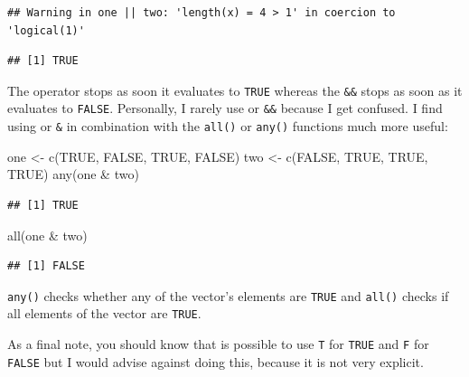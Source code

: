 \documentclass[
]{article}
\newenvironment{Shaded}{\begin{snugshade}}{\end{snugshade}}
\newcommand{\ConstantTok}[1]{\textcolor[rgb]{0.00,0.00,0.00}{#1}}
\newcommand{\FunctionTok}[1]{\textcolor[rgb]{0.00,0.00,0.00}{#1}}
\newcommand{\NormalTok}[1]{#1}
\newcommand{\OtherTok}[1]{\textcolor[rgb]{0.56,0.35,0.01}{#1}}
\newcommand{\SpecialCharTok}[1]{\textcolor[rgb]{0.00,0.00,0.00}{#1}}
\begin{document}
\begin{verbatim}
## Warning in one || two: 'length(x) = 4 > 1' in coercion to 'logical(1)'
\end{verbatim}

\begin{verbatim}
## [1] TRUE
\end{verbatim}

The \texttt{\textbar{}\textbar{}} operator stops as soon it evaluates to \texttt{TRUE} whereas the \texttt{\&\&} stops as soon as it evaluates to \texttt{FALSE}.
Personally, I rarely use \texttt{\textbar{}\textbar{}} or \texttt{\&\&} because I get confused. I find using \texttt{\textbar{}} or \texttt{\&} in combination with the
\texttt{all()} or \texttt{any()} functions much more useful:

\begin{Shaded}
\begin{Highlighting}[]
\NormalTok{one }\OtherTok{\textless{}{-}} \FunctionTok{c}\NormalTok{(}\ConstantTok{TRUE}\NormalTok{, }\ConstantTok{FALSE}\NormalTok{, }\ConstantTok{TRUE}\NormalTok{, }\ConstantTok{FALSE}\NormalTok{)}
\NormalTok{two }\OtherTok{\textless{}{-}} \FunctionTok{c}\NormalTok{(}\ConstantTok{FALSE}\NormalTok{, }\ConstantTok{TRUE}\NormalTok{, }\ConstantTok{TRUE}\NormalTok{, }\ConstantTok{TRUE}\NormalTok{)}
\FunctionTok{any}\NormalTok{(one }\SpecialCharTok{\&}\NormalTok{ two)}
\end{Highlighting}
\end{Shaded}

\begin{verbatim}
## [1] TRUE
\end{verbatim}

\begin{Shaded}
\begin{Highlighting}[]
\FunctionTok{all}\NormalTok{(one }\SpecialCharTok{\&}\NormalTok{ two)}
\end{Highlighting}
\end{Shaded}

\begin{verbatim}
## [1] FALSE
\end{verbatim}

\texttt{any()} checks whether any of the vector's elements are \texttt{TRUE} and \texttt{all()} checks if all elements of the vector are
\texttt{TRUE}.

As a final note, you should know that is possible to use \texttt{T} for \texttt{TRUE} and \texttt{F} for \texttt{FALSE} but I
would advise against doing this, because it is not very explicit.
\end{document}
